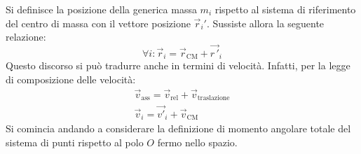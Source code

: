 \documentclass[10pt,a4paper]{book}
\begin{document}
Si definisce la posizione della generica massa $m_i$ rispetto al sistema di riferimento del centro di massa con il vettore posizione $\vec{r}_i'$. Sussiste allora la seguente relazione:
\[
	\forall i: \vec{r}_i = \vec{r}_\text{CM} + \vec{r\,'}_i
\]
Questo discorso si può tradurre anche in termini di velocità. Infatti, per la legge di composizione delle velocità:
\begin{gather*}
	\vec{v}_{\text{ass} } = \vec{v}_{\text{rel} } + \vec{v}_{\text{traslazione}}\\
	\vec{v}_i = \vec{v'}_i + \vec{v}_\text{CM}
\end{gather*}
Si comincia andando a considerare la definizione di momento angolare totale del sistema di punti rispetto al polo $O$ fermo nello spazio.
\begin{figure}[htpb]
	\centering


	\begin{tikzpicture}[x=0.75pt,y=0.75pt,yscale=-1,xscale=1]


\end{tikzpicture}
\end{figure}
\end{document}
